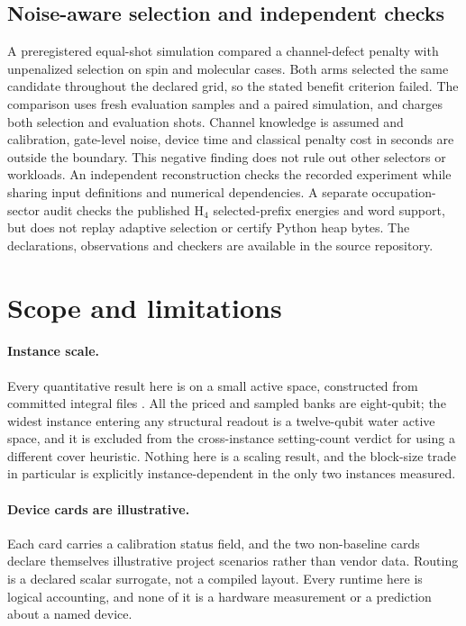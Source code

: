 \documentclass[aps,pra,reprint,superscriptaddress,nofootinbib,floatfix,
  showkeys]{revtex4-2}
\begin{document}
\subsection{Noise-aware selection and independent checks}

A preregistered equal-shot simulation compared a channel-defect penalty with
unpenalized selection on spin and molecular cases. Both arms selected the same
candidate throughout the declared grid, so the stated benefit criterion failed.
The comparison uses fresh evaluation samples and a paired simulation, and
charges both selection and evaluation shots. Channel knowledge is assumed and
calibration, gate-level noise, device time and classical penalty cost in seconds
are outside the boundary. This negative finding does not rule out other
selectors or workloads. An independent reconstruction checks the recorded
experiment while sharing input definitions and numerical dependencies. A
separate occupation-sector audit checks the published H$_4$ selected-prefix
energies and word support, but does not replay adaptive selection or certify
Python heap bytes. The declarations, observations and checkers are available
in the source repository.

\section{Scope and limitations}
\label{sec:limits}

\paragraph{Instance scale.}  Every quantitative result here is on a small active
space, constructed from committed integral files
\cite{knowles1989fcidump,sun2018pyscf}.  All the priced and sampled banks are
eight-qubit; the widest instance entering any structural readout is a
twelve-qubit water active space, and it is excluded from the cross-instance
setting-count verdict for using a different cover heuristic.  Nothing here is a
scaling result, and the block-size trade in particular is explicitly
instance-dependent in the only two instances measured.

\paragraph{Device cards are illustrative.}  Each card carries a calibration
status field, and the two non-baseline cards declare themselves illustrative
project scenarios rather than vendor data.  Routing is a declared scalar
surrogate, not a compiled layout.  Every runtime here is logical accounting, and
none of it is a hardware measurement or a prediction about a named device.
\end{document}
